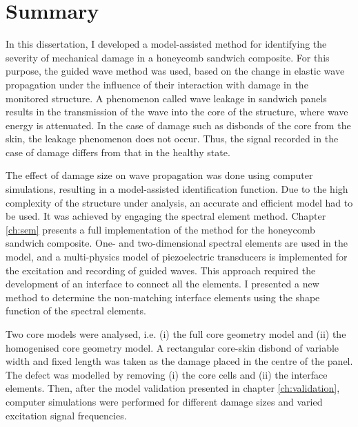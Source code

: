 
\chapter[Summary]{Summary}
\label{ch:summary}

In this dissertation, I developed a model-assisted method for identifying the severity of mechanical damage in a honeycomb sandwich composite. 
For this purpose, the guided wave method was used, based on the change in elastic wave propagation under the influence of their interaction with damage in the monitored structure.
A phenomenon called wave leakage in sandwich panels results in the transmission of the wave into the core of the structure, where wave energy is attenuated.
In the case of damage such as disbonds of the core from the skin, the leakage phenomenon does not occur.
Thus, the signal recorded in the case of damage differs from that in the healthy state.

The effect of damage size on wave propagation was done using computer simulations, resulting in a model-assisted identification function.
Due to the high complexity of the structure under analysis, an accurate and efficient model had to be used.
It was achieved by engaging the spectral element method.
Chapter \ref{ch:sem} presents a full implementation of the method for the honeycomb sandwich composite.
One- and two-dimensional spectral elements are used in the model, and a multi-physics model of piezoelectric transducers is implemented for the excitation and recording of guided waves.
This approach required the development of an interface to connect all the elements.
I presented a new method to determine the non-matching interface elements using the shape function of the spectral elements.

Two core models were analysed, i.e. (i) the full core geometry model and (ii) the homogenised core geometry model.
A rectangular core-skin disbond of variable width and fixed length was taken as the damage placed in the centre of the panel.
The defect was modelled by removing (i) the core cells and (ii) the interface elements.
Then, after the model validation presented in chapter \ref{ch:validation}, computer simulations were performed for different damage sizes and varied excitation signal frequencies.

